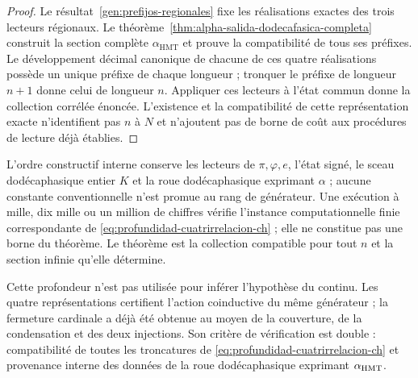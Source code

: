 \begin{proof}
Le résultat~\ref{gen:prefijos-regionales} fixe les réalisations exactes des trois lecteurs régionaux. Le théorème~\ref{thm:alpha-salida-dodecafasica-completa} construit la section complète \(\alpha_{\mathrm{HMT}}\) et prouve la compatibilité de tous ses préfixes. Le développement décimal canonique de chacune de ces quatre réalisations possède un unique préfixe de chaque longueur ; tronquer le préfixe de longueur \(n+1\) donne celui de longueur \(n\). Appliquer ces lecteurs à l'état commun donne la collection corrélée énoncée. L'existence et la compatibilité de cette représentation exacte n'identifient pas \(n\) à \(N\) et n'ajoutent pas de borne de coût aux procédures de lecture déjà établies.
\end{proof}

L'ordre constructif interne conserve les lecteurs de \(\pi,\varphi,e\), l'état signé, le sceau dodécaphasique entier \(K\) et la roue dodécaphasique exprimant \(\alpha\) ; aucune constante conventionnelle n'est promue au rang de générateur. Une exécution à mille, dix mille ou un million de chiffres vérifie l'instance computationnelle finie correspondante de \eqref{eq:profundidad-cuatrirrelacion-ch} ; elle ne constitue pas une borne du théorème. Le théorème est la collection compatible pour tout \(n\) et la section infinie qu'elle détermine.

Cette profondeur n'est pas utilisée pour inférer l'hypothèse du continu. Les quatre représentations certifient l'action coinductive du même générateur ; la fermeture cardinale a déjà été obtenue au moyen de la couverture, de la condensation et des deux injections. Son critère de vérification est double : compatibilité de toutes les troncatures de \eqref{eq:profundidad-cuatrirrelacion-ch} et provenance interne des données de la roue dodécaphasique exprimant \(\alpha_{\rm HMT}\).
